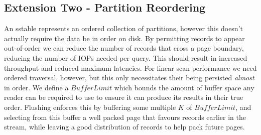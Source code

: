 \documentclass[fleqn]{article}
\begin{document}
\clearpage
\subsection{Extension Two - Partition Reordering}
\small
    An sstable represents an ordered collection of partitions, however this doesn't
    actually require the data be in order on disk. By permitting records to appear out-of-order
    we can reduce the number of records that cross a page boundary, reducing the number of IOPs 
    needed per query. This should result in increased throughput and reduced maximum latencies. 
    For linear scan performance we need ordered traversal, however, but this only necessitates
    their being persisted \emph{almost} in order. We define a $BufferLimit$ which bounds the amount 
    of buffer space any reader can be required to use to ensure it can produce its results in their 
    true order. Flushing enforces this by buffering some multiple $K$ of $BufferLimit$, and selecting 
    from this buffer a well packed page that favours records earlier in the stream, while leaving a 
    good distribution of records to help pack future pages.
\end{document}
